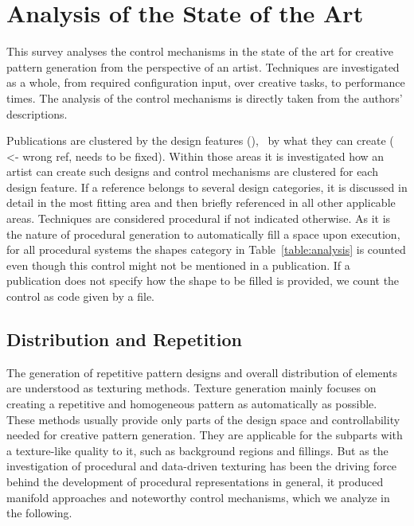 

\section{Analysis of the State of the Art}
\label{sec:analysis}

This survey analyses the control mechanisms in the state of the art for creative pattern generation from the perspective of an artist. Techniques are investigated as a whole, from required configuration input, over creative tasks, to performance times. The analysis of the control mechanisms is directly taken from the authors' descriptions. 

Publications are clustered by the design features (), \ie~by what they can create ( <- wrong ref, needs to be fixed). 
Within those areas it is investigated how an artist can create such designs and control mechanisms are clustered for each design feature. If a reference belongs to several design categories, it is discussed in detail in the most fitting area and then briefly referenced in all other applicable areas. Techniques are considered procedural if not indicated otherwise. As it is the nature of procedural generation to automatically fill a space upon execution, for all procedural systems the shapes category in Table~\ref{table:analysis} is counted even though this control might not be mentioned in a publication. 
If a publication does not specify how the shape to be filled is provided, we count the control as code given by a file.

\subsection{Distribution and Repetition}
\label{subsec:analysis_distribution_and_repetition}

The generation of repetitive pattern designs and overall distribution of elements are understood as texturing methods. Texture generation mainly focuses on creating a repetitive and homogeneous pattern as automatically as possible. These methods usually provide only parts of the design space and controllability needed for creative pattern generation. They are applicable for the subparts with a texture-like quality to it, such as background regions and fillings. But as the investigation of procedural and data-driven texturing has been the driving force behind the development of procedural representations in general, it produced manifold approaches and noteworthy control mechanisms, which we analyze in the following.



